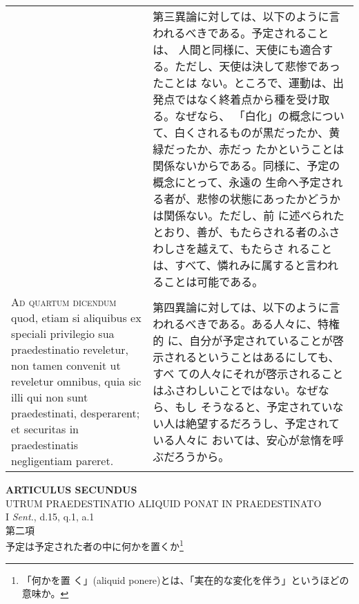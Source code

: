 \documentclass[10pt]{jsarticle} %
\begin{document}
\begin{longtable}{p{21em}p{21em}}
 
&

第三異論に対しては、以下のように言われるべきである。予定されることは、
人間と同様に、天使にも適合する。ただし、天使は決して悲惨であったことは
ない。ところで、運動は、出発点ではなく終着点から種を受け取る。なぜなら、
「白化」の概念について、白くされるものが黒だったか、黄緑だったか、赤だっ
たかということは関係ないからである。同様に、予定の概念にとって、永遠の
生命へ予定される者が、悲惨の状態にあったかどうかは関係ない。ただし、前
に述べられたとおり、善が、もたらされる者のふさわしさを越えて、もたらさ
れることは、すべて、憐れみに属すると言われることは可能である。



\\


{\scshape Ad quartum dicendum} quod, etiam si aliquibus
ex speciali privilegio sua praedestinatio reveletur, non tamen convenit
ut reveletur omnibus, quia sic illi qui non sunt praedestinati,
desperarent; et securitas in praedestinatis negligentiam pareret.

 
&

第四異論に対しては、以下のように言われるべきである。ある人々に、特権的
に、自分が予定されていることが啓示されるということはあるにしても、すべ
ての人々にそれが啓示されることはふさわしいことではない。なぜなら、もし
そうなると、予定されていない人は絶望するだろうし、予定されている人々に
おいては、安心が怠惰を呼ぶだろうから。



\end{longtable}
\newpage

\begin{center}
 {\Large {\bf ARTICULUS SECUNDUS}}\\
 {\large UTRUM PRAEDESTINATIO ALIQUID PONAT IN PRAEDESTINATO}\\
 {\footnotesize I {\itshape Sent.}, d.15, q.1, a.1}\\
 {\Large 第二項\\予定は予定された者の中に何かを置くか\footnote{「何かを置
 く」(aliquid ponere)とは、「実在的な変化を伴う」というほどの意味か。}}
\end{center}
\end{document}
